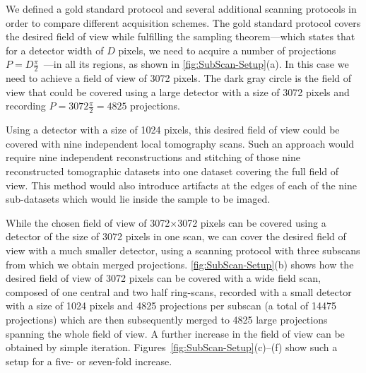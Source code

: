 We defined a gold standard protocol and several additional scanning protocols in order to compare different acquisition schemes. The gold standard protocol covers the desired field of view while fulfilling the sampling theorem---which states that for a detector width of $D$ pixels, we need to acquire a number of projections $P=D\frac{\pi}{2}$~\cite{Kak2002}---in all its regions, as shown in \autoref{fig:SubScan-Setup}(a). In this case we need to achieve a field of view of 3072 pixels. The dark gray circle is the field of view that could be covered using a large detector with a size of 3072 pixels and recording $P=3072\frac{\pi}{2}=4825$ projections.

Using a detector with a size of 1024 pixels, this desired field of view could be covered with nine independent local tomography scans. Such an approach would require nine independent reconstructions and stitching of those nine reconstructed tomographic datasets into one dataset covering the full field of view. This method would also introduce artifacts at the edges of each of the nine sub-datasets which would lie inside the sample to be imaged.

While the chosen field of view of 3072$\times$3072 pixels can be covered using a detector of the size of 3072 pixels in one scan, we can cover the desired field of view with a much smaller detector, using a scanning protocol with three subscans from which we obtain merged projections. \autoref{fig:SubScan-Setup}(b) shows how the desired field of view of 3072 pixels can be covered with a wide field scan, composed of one central and two half ring-scans, recorded with a small detector with a size of 1024 pixels and 4825 projections per subscan (a total of 14475 projections) which are then subsequently merged to 4825 large projections spanning the whole field of view. A further increase in the field of view can be obtained by simple iteration. Figures~\ref{fig:SubScan-Setup}(c)--(f) show such a setup for a five- or seven-fold increase.

